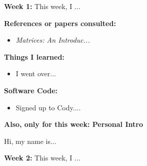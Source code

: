 \documentclass{article}
\begin{document}
\textbf{Week 1:}
This week, I ...

\textbf{References or papers consulted:}
\begin{itemize}
\item {\em Matrices: An Introduc...}
\end{itemize}

\textbf{Things I learned:}
\begin{itemize}
\item I went over...
\end{itemize}

\textbf{Software Code:}
 \begin{itemize}
\item Signed up to Cody....
\end{itemize}


\textbf{Also, only for this week: Personal Intro}

Hi, my name is...



\newpage 

\textbf{Week 2:}
This week, I ...
\end{document}
